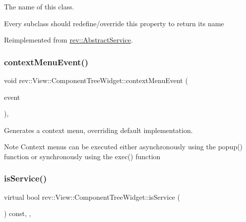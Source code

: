 The name of this class. 

Every subclass should redefine/override this property to return its name 

Reimplemented from \mbox{\hyperlink{classrev_1_1_abstract_service_a0b64ee4651db7637a70265697ca62453}{rev\+::\+Abstract\+Service}}.

\mbox{\label{classrev_1_1_view_1_1_component_tree_widget_a631e57e4eb3b019dce9a0f3e3a9d8c25}} 
\subsubsection{\texorpdfstring{contextMenuEvent()}{contextMenuEvent()}}
{\footnotesize\ttfamily void rev\+::\+View\+::\+Component\+Tree\+Widget\+::context\+Menu\+Event (\begin{DoxyParamCaption}\item[{Q\+Context\+Menu\+Event $\ast$}]{event }\end{DoxyParamCaption})\hspace{0.3cm}{\ttfamily [override]}, {\ttfamily [protected]}}



Generates a context menu, overriding default implementation. 

\begin{DoxyNote}{Note}
Context menus can be executed either asynchronously using the popup() function or synchronously using the exec() function 
\end{DoxyNote}
\mbox{\label{classrev_1_1_view_1_1_component_tree_widget_a1811835dc4d0be8a33bbe261299e1744}} 
\subsubsection{\texorpdfstring{isService()}{isService()}}
{\footnotesize\ttfamily virtual bool rev\+::\+View\+::\+Component\+Tree\+Widget\+::is\+Service (\begin{DoxyParamCaption}{ }\end{DoxyParamCaption}) const\hspace{0.3cm}{\ttfamily [inline]}, {\ttfamily [override]}, {\ttfamily [virtual]}}



